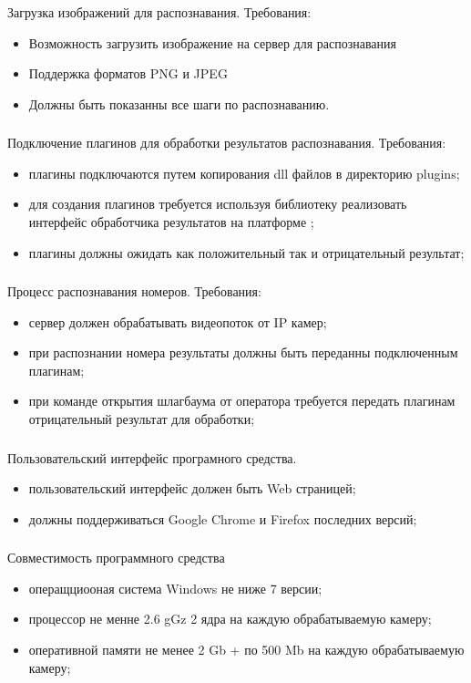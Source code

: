 \subsubsection{}
Загрузка изображений для распознавания. Требования:
\begin{itemize}
	\item Возможность загрузить изображение на сервер для распознавания
	\item Поддержка форматов PNG и JPEG
  \item Должны быть показанны все шаги по распознаванию.
\end{itemize}

\subsubsection{}
Подключение плагинов для обработки результатов распознавания. Требования:
\begin{itemize}
	\item плагины подключаются путем копирования dll файлов в директорию plugins;
	\item для создания плагинов требуется используя библиотеку реализовать интерфейс обработчика результатов на платформе \dotnet{};
	\item плагины должны ожидать как положительный так и отрицательный результат;
\end{itemize}

\subsubsection{}
Процесс распознавания номеров. Требования:
\begin{itemize}
	\item сервер должен обрабатывать видеопоток от IP камер;
	\item при распознании номера результаты должны быть переданны подключенным плагинам;
	\item при команде открытия шлагбаума от оператора требуется передать плагинам отрицательный результат для обработки;
\end{itemize}

\subsubsection{}
Пользовательский интерфейс програмного средства.
\begin{itemize}
	\item пользовательский интерфейс должен быть Web страницей;
	\item должны поддерживаться Google Chrome и Firefox последних версий;
\end{itemize}

\subsubsection{}
Совместимость программного средства
\begin{itemize}
  \item операщциооная система Windows не ниже 7 версии;
	\item процессор не менне 2.6 gGz 2 ядра на каждую обрабатываемую камеру;
  \item оперативной памяти не менее 2 Gb + по 500 Mb на каждую обрабатываемую камеру;
\end{itemize}